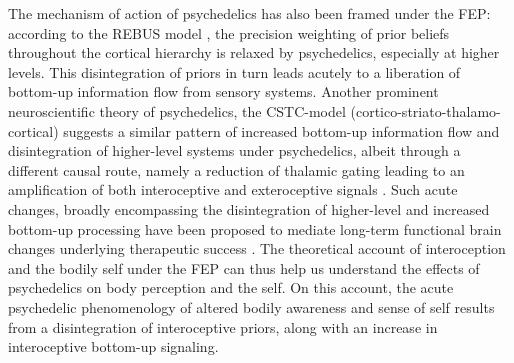 \documentclass{article}
\begin{document}

The mechanism of action of psychedelics has also been framed under the FEP: according to the REBUS model \parencite[RElaxed Beliefs Under pSychedelics]{Carhart-Harris2019-dq}, the precision weighting of prior beliefs throughout the cortical hierarchy is relaxed by psychedelics, especially at higher levels. This disintegration of priors in turn leads acutely to a liberation of bottom-up information flow from sensory systems.
Another prominent neuroscientific theory of psychedelics, the CSTC-model (cortico-striato-thalamo-cortical) %
suggests a similar pattern of increased bottom-up information flow and disintegration of higher-level systems under psychedelics, albeit through a different causal route, namely a reduction of thalamic gating leading to an amplification of both interoceptive and exteroceptive signals \parencite{Vollenweider2020-oq}.
Such acute changes, broadly encompassing the disintegration of higher-level and increased bottom-up processing have been proposed to mediate long-term functional brain changes underlying therapeutic success \parencite{daws2021decreased, Carhart-Harris2019-dq}.
The theoretical account of interoception and the bodily self under the FEP can thus help us understand the effects of psychedelics on body perception and the self.
On this account, the acute psychedelic phenomenology of altered bodily awareness and sense of self results from a disintegration of interoceptive priors, along with an increase in interoceptive bottom-up signaling.
\end{document}
